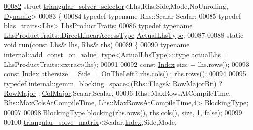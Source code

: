 \begin{DoxyCode}
\hyperlink{struct_eigen_1_1internal_1_1triangular__solver__selector_3_01_lhs_00_01_rhs_00_01_side_00_01_mod9d4c365fbf3ecd733e3c477f950cfbe8}{00082} \textcolor{keyword}{struct }\hyperlink{struct_eigen_1_1internal_1_1triangular__solver__selector}{triangular\_solver\_selector}<Lhs,Rhs,Side,Mode,NoUnrolling,
      \hyperlink{namespace_eigen_ad81fa7195215a0ce30017dfac309f0b2}{Dynamic}>
00083 \{
00084   \textcolor{keyword}{typedef} \textcolor{keyword}{typename} Rhs::Scalar Scalar;
00085   \textcolor{keyword}{typedef} \hyperlink{struct_eigen_1_1internal_1_1blas__traits}{blas\_traits<Lhs>} \hyperlink{struct_eigen_1_1internal_1_1blas__traits}{LhsProductTraits};
00086   \textcolor{keyword}{typedef} \textcolor{keyword}{typename} \hyperlink{class_eigen_1_1internal_1_1_tensor_lazy_evaluator_writable}{LhsProductTraits::DirectLinearAccessType} 
      \hyperlink{class_eigen_1_1internal_1_1_tensor_lazy_evaluator_writable}{ActualLhsType};
00087 
00088   \textcolor{keyword}{static} \textcolor{keywordtype}{void} run(\textcolor{keyword}{const} Lhs& lhs, Rhs& rhs)
00089   \{
00090     \textcolor{keyword}{typename} \hyperlink{group___sparse_core___module}{internal::add\_const\_on\_value\_type<ActualLhsType>::type}
       actualLhs = LhsProductTraits::extract(lhs);
00091 
00092     \textcolor{keyword}{const} \hyperlink{namespace_eigen_a62e77e0933482dafde8fe197d9a2cfde}{Index} size = lhs.rows();
00093     \textcolor{keyword}{const} \hyperlink{namespace_eigen_a62e77e0933482dafde8fe197d9a2cfde}{Index} othersize = Side==\hyperlink{group__enums_ggac22de43beeac7a78b384f99bed5cee0ba129609b3bdf23b071f5f86cf2f995ec4}{OnTheLeft}? rhs.cols() : rhs.rows();
00094 
00095     \textcolor{keyword}{typedef} \hyperlink{class_eigen_1_1internal_1_1gemm__blocking__space}{internal::gemm\_blocking\_space}<(Rhs::Flags&
      \hyperlink{group__flags_gae4f56c2a60bbe4bd2e44c5b19cbe8762}{RowMajorBit}) ? \hyperlink{group__enums_ggaacded1a18ae58b0f554751f6cdf9eb13acfcde9cd8677c5f7caf6bd603666aae3}{RowMajor} : \hyperlink{group__enums_ggaacded1a18ae58b0f554751f6cdf9eb13a0cbd4bdd0abcfc0224c5fcb5e4f6669a}{ColMajor},Scalar,Scalar,
00096               Rhs::MaxRowsAtCompileTime, Rhs::MaxColsAtCompileTime, Lhs::MaxRowsAtCompileTime,4> 
      BlockingType;
00097 
00098     BlockingType blocking(rhs.rows(), rhs.cols(), size, 1, \textcolor{keyword}{false});
00099 
00100     \hyperlink{struct_eigen_1_1internal_1_1triangular__solve__matrix}{triangular\_solve\_matrix}<Scalar,\hyperlink{namespace_eigen_a62e77e0933482dafde8fe197d9a2cfde}{Index},Side,Mode,

\end{DoxyCode}
